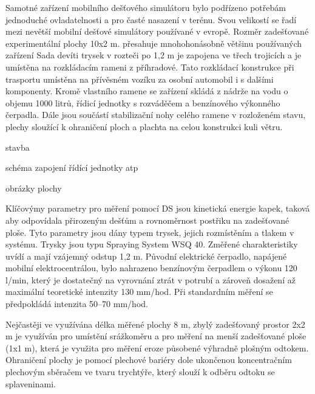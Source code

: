 \label{sss:ds_mobile}

Samotné zařízení mobilního dešťového simulátoru bylo podřízeno potřebám jednoduché ovladatelnosti a pro časté nasazení v terénu. Svou velikostí se řadí mezi nevětší mobilní dešťové simulátory používané v evropě. Rozměr zadešťované experimentální plochy 10x2 m. přesahuje mnohohonásobně většinu používaných zařízení \citep{Iserloh2013}  Sada devíti trysek v rozteči po 1,2 m je zapojena ve třech trojicích a je umístěna na rozkládacím rameni z příhradové.
Tato rozkládací konstrukce při trasportu umístěna na přívěsném vozíku za osobní automobil i s dalšími komponenty. Kromě vlastního ramene se zařízení skládá z nádrže na vodu o objemu 1000 litrů, řídicí jednotky s rozváděčem \label{kaitolas rovaděčem} a benzínového výkonného čerpadla. Dále jsou součástí stabilizační nohy celého ramene v rozloženém stavu, plechy sloužící k ohraničení ploch a plachta na celou konstrukci kuli větru.

stavba

schéma zapojení řídící jednotky atp

obrázky plochy

 
Klíčovýmy parametry pro měření pomocí DS jsou kinetická energie kapek, taková aby odpovídala přirozeným dešťům a rovnoměrnost postřiku na zadešťované ploše. Tyto parametry jsou dány typem trysek, jejich rozmístěním a tlakem v systému. Trysky jsou typu Spraying System WSQ 40. Změřené charakteristiky uvídí \cite{Strauss2000} a mají vzájemný odstup 1,2 m. Původní elektrické čerpadlo, napájené mobilní elektrocentrálou, bylo nahrazeno benzínovým čerpadlem o výkonu 120 l/min, který je dostatečný na vyrovnání ztrát v potrubí a zároveň dosažení až maximální teoretické intenzity 130 mm/hod. Při standardním měření se předpokládá intenzita 50–70 mm/hod.

Nejčastěji ve využívána délka měřené plochy 8 m, zbylý zadešťovaný prostor 2x2 m je využíván pro umístění srážkoměru a pro měření na menší zadešťované ploše (1x1 m), která je využita pro měření eroze působené výhradně plošným odtokem. Ohraničení plochy je pomocí plechové bariéry dole ukončenou koncentračním plechovým sběračem ve tvaru trychtýře, který slouží k odběru odtoku se splaveninami.